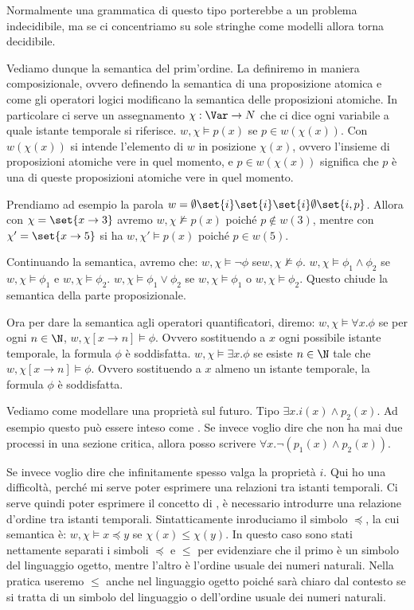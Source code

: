 Normalmente una grammatica di questo tipo porterebbe a un problema indecidibile, ma se ci concentriamo su sole stringhe come modelli allora torna decidibile.

Vediamo dunque la semantica del prim'ordine. La definiremo in maniera composizionale, ovvero definendo la semantica di una proposizione atomica e come gli operatori logici modificano la semantica delle proposizioni atomiche.
In particolare ci serve un assegnamento \(\chi : \Var \to N\) che ci dice ogni variabile a quale istante temporale si riferisce.
\(w,\chi \models p(x)\) se \(p \in w(\chi(x))\). Con \(w(\chi(x))\) si intende l'elemento di \(w\) in posizione \(\chi(x)\), ovvero l'insieme di proposizioni atomiche vere in quel momento, e \(p \in w(\chi(x))\) significa che \(p\) è una di queste proposizioni atomiche vere in quel momento.

Prendiamo ad esempio la parola \(w = \emptyset \set{i} \set{i} \set{i} \emptyset \set{i,p}\). Allora con \(\chi = \set{x \to 3}\) avremo \(w,\chi \not\models p(x)\) poiché \(p \not\in w(3)\), mentre con \(\chi' = \set{x \to 5}\) si ha \(w,\chi' \models p(x)\) poiché \(p \in w(5)\).

Continuando la semantica, avremo che:
\(w,\chi \models \neg \phi\) se\(w,\chi \not\models \phi\).
\(w,\chi \models \phi_1 \land \phi_2\) se \(w,\chi \models \phi_1\) e \(w,\chi \models \phi_2\).
\(w,\chi \models \phi_1 \lor \phi_2\) se \(w,\chi \models \phi_1\) o \(w,\chi \models \phi_2\).
Questo chiude la semantica della parte proposizionale.

Ora per dare la semantica agli operatori quantificatori, diremo:
\(w,\chi \models \forall x.\phi\) se per ogni \(n \in \N\), \(w,\chi[x \to n] \models \phi\). Ovvero sostituendo a \(x\) ogni possibile istante temporale, la formula \(\phi\) è soddisfatta.
\(w,\chi \models \exists x.\phi\) se esiste \(n \in \N\) tale che \(w,\chi[x \to n] \models \phi\). Ovvero sostituendo a \(x\) almeno un istante temporale, la formula \(\phi\) è soddisfatta.

Vediamo come modellare una proprietà sul futuro. Tipo \(\exists x. i(x) \land p_2(x)\). Ad esempio questo può essere inteso come .
Se invece voglio dire che non ha mai due processi in una sezione critica, allora posso scrivere \(\forall x. \neg (p_1(x) \land p_2(x))\).

Se invece voglio dire che infinitamente spesso valga la proprietà \(i\). Qui ho una difficoltà, perché mi serve poter esprimere una relazioni tra istanti temporali.
Ci serve quindi poter esprimere il concetto di , è necessario introdurre una relazione d'ordine tra istanti temporali.
Sintatticamente inroduciamo il simbolo \(\preceq\), la cui semantica è:
\(w,\chi \models x\preceq y\) se \(\chi(x) \leq \chi(y)\). In questo caso sono stati nettamente separati i simboli \(\preceq\) e \(\leq\) per evidenziare che il primo è un simbolo del linguaggio ogetto, mentre l'altro è l'ordine usuale dei numeri naturali.
Nella pratica useremo \(\leq\) anche nel linguaggio ogetto poiché sarà chiaro dal contesto se si tratta di un simbolo del linguaggio o dell'ordine usuale dei numeri naturali.

